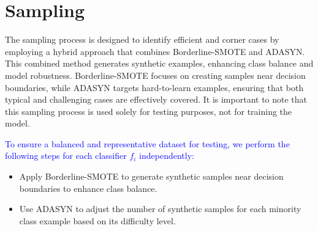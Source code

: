 


\section{Sampling}

The sampling process is designed to identify efficient and corner cases by employing a hybrid approach that combines Borderline-SMOTE and ADASYN. This combined method generates synthetic examples, enhancing class balance and model robustness. Borderline-SMOTE focuses on creating samples near decision boundaries, while ADASYN targets hard-to-learn examples, ensuring that both typical and challenging cases are effectively covered. It is important to note that this sampling process is used solely for testing purposes, not for training the model.

\textcolor{blue}{To ensure a balanced and representative dataset for testing, we perform the following steps for each classifier $f_i$ independently:}
\begin{itemize}
    \item Apply Borderline-SMOTE to generate synthetic samples near decision boundaries to enhance class balance.
    \item Use ADASYN to adjust the number of synthetic samples for each minority class example based on its difficulty level.
\end{itemize}

